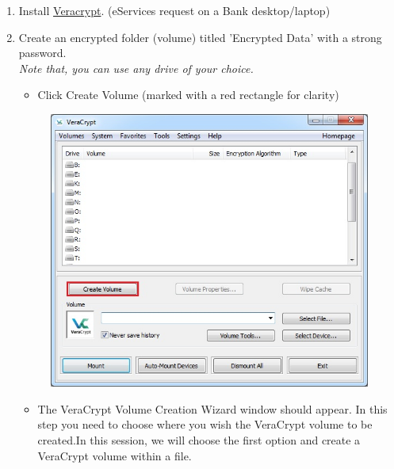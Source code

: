 \documentclass{tufte-handout}
\begin{document}
\begin{enumerate}
	\item Install \href{https://www.veracrypt.fr/en/Downloads.html}{Veracrypt}. (eServices request on a Bank desktop/laptop)
	\item Create an encrypted folder (volume) titled 'Encrypted Data' with a strong password. \\
	\textit{Note that, you can use any drive of your choice.}
	\begin{itemize}
		\item  Click Create Volume (marked with a red rectangle for clarity)
	\end{itemize}
	\begin{figure}%
		\includegraphics[width=\linewidth]{img/vc_install_1.png}
	\end{figure}
	\FloatBarrier
	\begin{itemize}
	\item  The VeraCrypt Volume Creation Wizard window should appear.
	In this step you need to choose where you wish the VeraCrypt volume to be created.In this session, we will choose the first option and create a VeraCrypt volume within a file.
	\end{itemize}
	\begin{figure}

\end{figure}
\end{enumerate}
\end{document}

